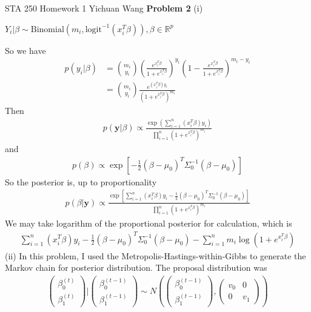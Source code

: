\documentclass[12pt]{article}
\begin{document}
\noindent STA 250 Homework 1 \newline Yichuan Wang \newline \newline
\textbf{Problem 2} \newline
(i)
\begin{center}
	$Y_i|\beta \sim \text{Binomial}(m_i, \text{logit}^{-1}(x_i^T\beta)), \beta \in \mathbb{R}^p$
\end{center}
So we have
\begin{align*}
	p(y_i|\beta) &= {m_i \choose y_i}(\frac{e^{x_i^T\beta}}{1+e^{x_i^T\beta}})^{y_i}(1 - \frac{e^{x_i^T\beta}}{1+e^{x_i^T\beta}})^{m_i - y_i} \\
	&= {m_i \choose y_i}\frac{e^{(x_i^T\beta)y_i}}{(1+e^{x_i^T\beta})^{m_i}}
\end{align*}
Then
\begin{align*}
	p(\mathbf{y}|\beta) \propto \frac{\exp({\sum_{i=1}^n(x_i^T\beta)y_i})}{\prod_{i=1}^n (1+e^{x_i^T\beta})^{m_i}}
\end{align*}
and
\begin{align*}
	p(\beta) \propto \exp[-\frac{1}{2}(\beta - \mu_0)^T \Sigma_0^{-1} (\beta - \mu_0)]
\end{align*}
So the posterior is, up to proportionality
\begin{align*}
	p(\beta|\mathbf{y}) \propto \frac{\exp[\sum_{i=1}^n(x_i^T\beta)y_i - \frac{1}{2}(\beta - \mu_0)^T \Sigma_0^{-1} (\beta - \mu_0)]}{\prod_{i=1}^n (1+e^{x_i^T\beta})^{m_i}}
\end{align*}
We may take logarithm of the proportional posterior for calculation, which is
\begin{align*}
	\sum_{i=1}^n(x_i^T\beta)y_i - \frac{1}{2}(\beta - \mu_0)^T \Sigma_0^{-1} (\beta - \mu_0) - \sum_{i=1}^n m_i \log(1+e^{x_i^T\beta})
\end{align*}
(ii) In this problem, I used the Metropolis-Hastings-within-Gibbs to generate the Markov chain for posterior distribution. The proposal distribution was
\begin{align*}
	\begin{pmatrix} \beta_0^{(t)} \\ \beta_1^{(t)} \end{pmatrix} | \begin{pmatrix} \beta_0^{(t-1)} \\ \beta_1^{(t-1)} \end{pmatrix} \sim 					N(\begin{pmatrix} \beta_0^{(t-1)} \\ \beta_1^{(t-1)} \end{pmatrix}, \begin{pmatrix} v_0 & 0 \\ 0 & v_1 \end{pmatrix}) \\
\end{align*}
\end{document}
